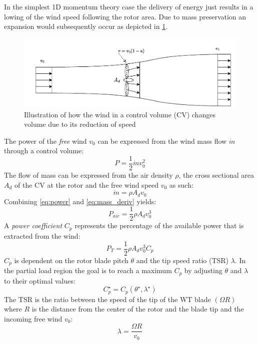 In the simplest 1D momentum theory case the delivery of energy just results in a lowing of the wind speed following the rotor area. Due to mass preservation an expansion would subsequently occur as depicted in \cref{fig:betz}.
\begin{figure}[h]
	\centering
	\includegraphics[width=0.8\linewidth]{Graphics/FlowThroughRotor.pdf}
	\caption{Illustration of how the wind in a control volume (CV) changes volume due to its reduction of speed}
	\label{fig:betz}
\end{figure}
The power of the \textit{free} wind $ v_0 $ can be expressed from the wind mass flow $ \dot{m} $ through a control volume:
\begin{equation} \label{eq:power}
	P = \dfrac{1}{2} \dot{m} v_0^2
\end{equation}
The flow of mass can be expressed from the air density $ \rho $, the cross sectional area $ A_d $ of the CV  at the rotor and the free wind speed $ v_0 $ as such:
\begin{equation}\label{eq:mass_deriv}
	\dot{m} = \rho A_d v_0
\end{equation}
Combining \cref{eq:power} and \cref{eq:mass_deriv} yields:
\begin{equation}\label{eq:power2}
	P_{air} = \dfrac{1}{2} \rho A_d v_0^3
\end{equation}
A \textit{power coefficient} $ C_p $ represents the percentage of the available power that is extracted from the wind:
\begin{equation}\label{eq:power_w_Cp}
	P_{T} = \dfrac{1}{2} \rho A_d v_0^3 C_p
\end{equation}
$ C_p $ is dependent on the rotor blade pitch $ \theta $ and the tip speed ratio (TSR) $ \lambda $. In the partial load region the goal is to reach a maximum $ C_p $ by adjusting $ \theta $ and  $ \lambda $ to their optimal values:
\begin{equation}\label{eq:cp_optimal}
	C_p^\star = C_p(\theta^\star, \lambda^\star)
\end{equation}
The TSR is the ratio between the speed of the tip of the WT blade $ (\Omega R) $ where $ R $ is the distance from the center of the rotor and the blade tip and the incoming free wind $v_0$:
\begin{equation}\label{eq:tipspeedratio}
	\lambda = \dfrac{\Omega R}{v_0}
\end{equation}

